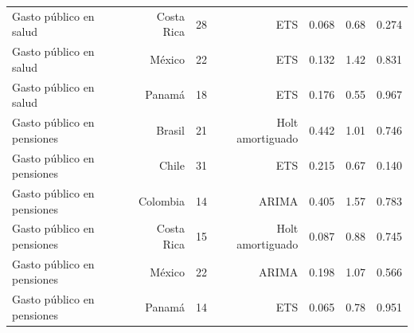 \begin{tabular}{lrrrrrr}
Gasto público en salud & Costa Rica & 28 & ETS & 0.068 & 0.68 & 0.274\\
Gasto público en salud & México & 22 & ETS & 0.132 & 1.42 & 0.831\\
Gasto público en salud & Panamá & 18 & ETS & 0.176 & 0.55 & 0.967\\
Gasto público en pensiones & Brasil & 21 & Holt amortiguado & 0.442 & 1.01 & 0.746\\
Gasto público en pensiones & Chile & 31 & ETS & 0.215 & 0.67 & 0.140\\
Gasto público en pensiones & Colombia & 14 & ARIMA & 0.405 & 1.57 & 0.783\\
Gasto público en pensiones & Costa Rica & 15 & Holt amortiguado & 0.087 & 0.88 & 0.745\\
Gasto público en pensiones & México & 22 & ARIMA & 0.198 & 1.07 & 0.566\\
Gasto público en pensiones & Panamá & 14 & ETS & 0.065 & 0.78 & 0.951\\
\bottomrule
\end{tabular}